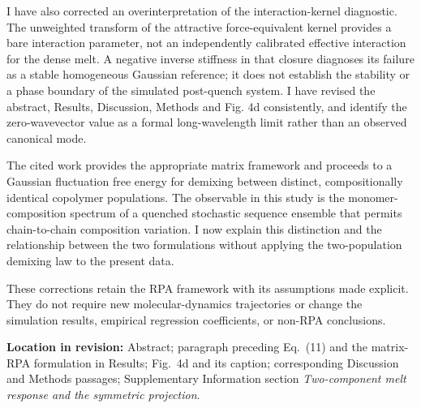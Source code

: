 \documentclass[11pt,letterpaper]{article}
\begin{document}
I have also corrected an overinterpretation of the interaction-kernel diagnostic. The unweighted transform of the attractive force-equivalent kernel provides a bare interaction parameter, not an independently calibrated effective interaction for the dense melt. A negative inverse stiffness in that closure diagnoses its failure as a stable homogeneous Gaussian reference; it does not establish the stability or a phase boundary of the simulated post-quench system. I have revised the abstract, Results, Discussion, Methods and Fig. 4d consistently, and identify the zero-wavevector value as a formal long-wavelength limit rather than an observed canonical mode.

The cited work provides the appropriate matrix framework and proceeds to a Gaussian fluctuation free energy for demixing between distinct, compositionally identical copolymer populations. The observable in this study is the monomer-composition spectrum of a quenched stochastic sequence ensemble that permits chain-to-chain composition variation. I now explain this distinction and the relationship between the two formulations without applying the two-population demixing law to the present data.

These corrections retain the RPA framework with its assumptions made explicit. They do not require new molecular-dynamics trajectories or change the simulation results, empirical regression coefficients, or non-RPA conclusions.

\textcolor{responseblue}{\textbf{Location in revision:} Abstract; paragraph preceding Eq.~(11) and the matrix-RPA formulation in Results; Fig.~4d and its caption; corresponding Discussion and Methods passages; Supplementary Information section \emph{Two-component melt response and the symmetric projection}.}
\end{document}
